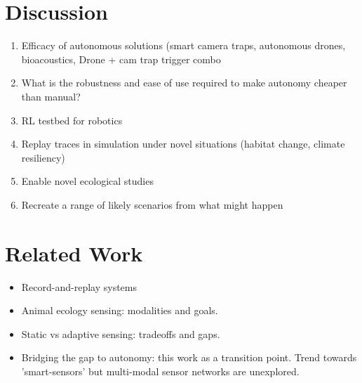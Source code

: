 \documentclass[letterpaper,twocolumn,10pt]{article}
\begin{document}
\section{Discussion}
\begin{enumerate}
    \item Efficacy of autonomous solutions (smart camera traps, autonomous drones, bioacoustics, Drone + cam trap trigger combo
    \item What is the robustness and ease of use required to make autonomy cheaper than manual?
    \item RL testbed for robotics
    \item Replay traces in simulation under novel situations (habitat change, climate resiliency)
    \item Enable novel ecological studies
    \item Recreate a range of likely scenarios from what might happen
\end{enumerate}



\section{Related Work}
\begin{itemize}
    \item Record-and-replay systems 
    \item Animal ecology sensing: modalities and goals.
    \item Static vs adaptive sensing: tradeoffs and gaps.
    \item Bridging the gap to autonomy: this work as a transition point. Trend towards 'smart-sensors' but multi-modal sensor networks are unexplored.
\end{itemize}
\end{document}
